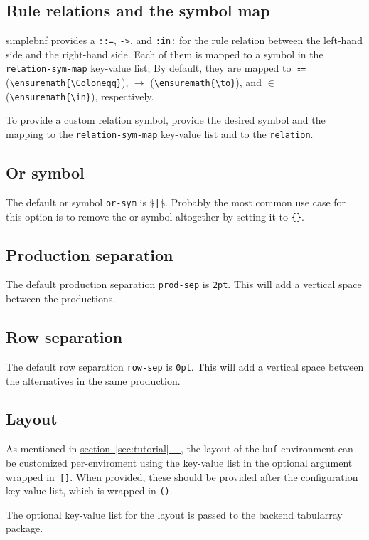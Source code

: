 \documentclass[11pt]{article}
\newcommand*{\secref}[1]{\hyperref[{#1}]{section~\ref*{#1} -- \emph{\nameref*{#1}}}}
\begin{document}
\subsection{Rule relations and the symbol map}
\textsf{simplebnf} provides a \verb/::=/, \verb/->/, and \verb/:in:/ for the rule relation between the left-hand side and the right-hand side.
Each of them is mapped to a symbol in the \verb/relation-sym-map/ key-value list; By default, they are mapped to $\Coloneqq$ (\verb/\ensuremath{\Coloneqq}/), $\to$ (\verb/\ensuremath{\to}/), and $\in$ (\verb/\ensuremath{\in}/), respectively.

To provide a custom relation symbol, provide the desired symbol and the mapping to the \verb/relation-sym-map/ key-value list and to the \verb/relation/.

\subsection{Or symbol}
The default or symbol \verb/or-sym/ is \verb/$|$/.
Probably the most common use case for this option is to remove the or symbol altogether by setting it to \verb/{}/.

\subsection{Production separation}
The default production separation \verb/prod-sep/ is \verb/2pt/.
This will add a vertical space between the productions.

\subsection{Row separation}
The default row separation \verb/row-sep/ is \verb/0pt/.
This will add a vertical space between the alternatives in the same production.

\subsection{Layout}\label{subsec:layout}
As mentioned in \secref{sec:tutorial}, the layout of the \verb/bnf/ environment can be customized per-enviroment using the key-value list in the optional argument wrapped in~\verb/[]/.
When provided, these should be provided after the configuration key-value list, which is wrapped in \verb/()/.

The optional key-value list for the layout is passed to the backend \textsf{tabularray} package.
\end{document}
